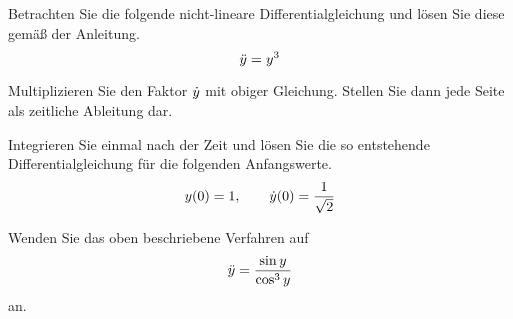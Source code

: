 \begin{atiTask}[
title = Die Methode des Energiesatzes
]
  \begin{atiSubtasks}
    \item{
      Betrachten Sie die folgende nicht-lineare Differentialgleichung und lösen Sie diese gemäß der Anleitung.
      \[
        \ddot{y} = y^3
      \]
      \begin{atiItems}
        \item{
          Multiplizieren Sie den Faktor $\dot{y}$ mit obiger Gleichung.
          Stellen Sie dann jede Seite als zeitliche Ableitung dar.
        }
        \item{
          Integrieren Sie einmal nach der Zeit und lösen Sie die so entstehende Differentialgleichung für die folgenden Anfangswerte.
          \[
            y(0) = 1 ,\qquad \dot{y}(0) = \frac{1}{\sqrt{2}}
          \]
        }
      \end{atiItems}
    }
    \item{
      Wenden Sie das oben beschriebene Verfahren auf
      \[
        \ddot{y} = \frac{\sin y}{\cos^3 y}
      \]
      an.
    }
  \end{atiSubtasks}
\end{atiTask}